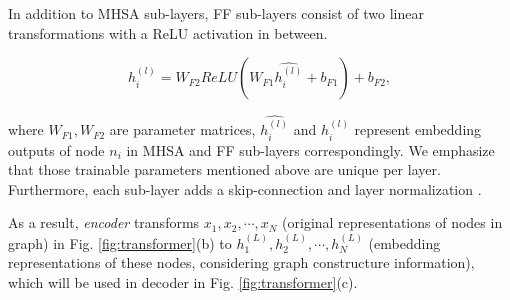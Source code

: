 In addition to MHSA sub-layers, FF sub-layers consist of two linear transformations with a ReLU activation in between.
\begin{small}
\begin{equation}
h_i^{(l)} = W_{F2}ReLU(W_{F1}\widehat{h_i^{(l)}}+b_{F1})+b_{F2},
\end{equation}
\end{small}
where $W_{F1}, W_{F2}$ are parameter matrices, $\widehat{h_i^{(l)}}$ and $h_i^{(l)}$ represent embedding outputs of node $n_i$ in MHSA and FF sub-layers correspondingly.
We emphasize that those trainable parameters mentioned above are unique per layer.
Furthermore, each sub-layer adds a skip-connection \cite{he2016deep} and layer normalization \cite{ba2016layer}.

As a result, \emph{encoder} transforms $x_1,x_2,\cdots,x_N$ (original representations of nodes in graph) in Fig. \ref{fig:transformer}(b)
to $h_1^{(L)},h_2^{(L)},\cdots,h_N^{(L)}$ (embedding representations of these nodes, considering graph constructure information), which will be used in decoder in Fig. \ref{fig:transformer}(c).

